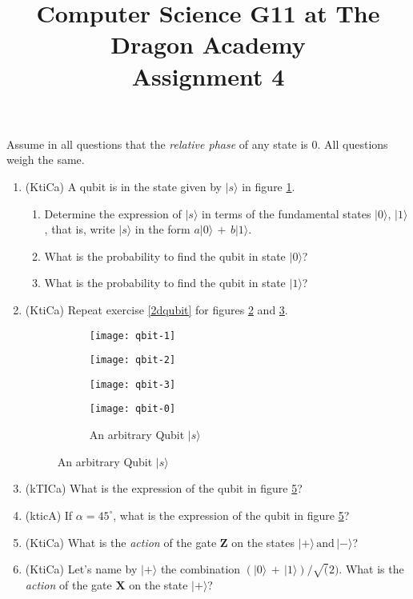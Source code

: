 \documentclass{article}
\title{
Computer Science G11 at The Dragon Academy\\
Assignment 4
}
\author{}
\begin{document}
\maketitle
Assume in all questions that the \textit{relative phase} of any state is $0$. All questions weigh the same.
\begin{enumerate}
\item \label{2dqubit}(KtiCa) A qubit is in the state given by $|s\rangle$ in figure \ref{qbit-1}.
	\begin{enumerate}
	\item Determine the expression of $|s\rangle$ in terms of the fundamental states $|0\rangle,\,|1\rangle$, that is, write $|s\rangle$ in the form 
		$a|0\rangle\,+\,b|1\rangle$.
	\item What is the probability to find the qubit in state $|0\rangle$?
	\item What is the probability to find the qubit in state $|1\rangle$?
	\end{enumerate}
\item (KtiCa) Repeat exercise \ref{2dqubit} for figures \ref{qbit-2} and \ref{qbit-3}. %
\begin{figure}[h]
\centering
	\begin{subfigure}[h]{0.25\textwidth}
	\texttt{[image: qbit-1]}
	\caption{}
	\label{qbit-1}
	\end{subfigure}
	\begin{subfigure}[h]{0.25\textwidth}
	\texttt{[image: qbit-2]}
	\caption{}
	\label{qbit-2}
	\end{subfigure}
	\begin{subfigure}[h]{0.25\textwidth}
	\texttt{[image: qbit-3]}
	\caption{}
	\label{qbit-3}
	\end{subfigure}
	\begin{subfigure}[h]{0.25\textwidth}
	\texttt{[image: qbit-0]}
	\caption{An arbitrary Qubit $|s\rangle$}
	\label{qbit-0}
	\end{subfigure}
\end{figure}
\item (kTICa) What is the expression of the qubit in figure \ref{qbit-0}?
\item (kticA) If $\alpha=45^\circ$, what is the expression of the qubit in figure \ref{qbit-0}?
\item (KtiCa) What is the \textit{action} of the gate $\mathbf{Z}$ on the states $|+\rangle\,\mbox{and}\,|-\rangle$?
\item (KtiCa) Let's name by $|+\rangle$ the combination $(|0\rangle\,+\,|1\rangle)/\sqrt(2)$. What is the \textit{action} of the gate $\mathbf{X}$ on the state $|+\rangle$?

\end{enumerate}
\end{document}
